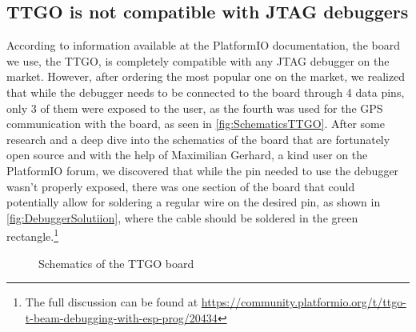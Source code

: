 \subsection{TTGO is not compatible with JTAG debuggers}
According to information available at the PlatformIO documentation, the board we use, the TTGO, is completely compatible with any JTAG debugger on the market. However, after ordering the most popular one on the market, we realized that while the debugger needs to be connected to the board through 4 data pins, only 3 of them were exposed to the user, as the fourth was used for the GPS communication with the board, as seen in \autoref{fig:SchematicsTTGO}. After some research and a deep dive into the schematics of the board that are fortunately open source and with the help of Maximilian Gerhard, a kind user on the PlatformIO forum, we discovered that while the pin needed to use the debugger wasn't properly exposed, there was one section of the board that could potentially allow for soldering a regular wire on the desired pin, as shown in \autoref{fig:DebuggerSolutiion}, where the cable should be soldered in the green rectangle.\footnote{The full discussion can be found at \url{https://community.platformio.org/t/ttgo-t-beam-debugging-with-esp-prog/20434}}
\begin{figure}[h!]
    \centering
    \advance\leftskip-4cm
    \advance\rightskip-4cm
    \qquad
    \caption{Schematics of the TTGO board \cite{TTGOSchematics}}%
    \label{fig:SchematicsTTGO}%
\end{figure}


